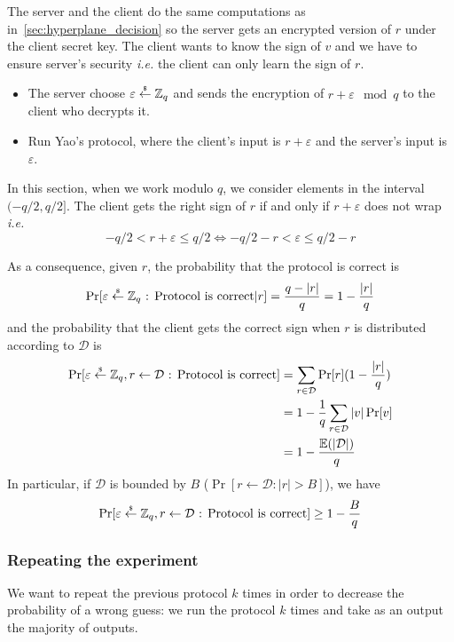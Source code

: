 \documentclass[11pt]{article}
\begin{document}
The server and the client do the same computations as in~\ref{sec:hyperplane_decision} so the server gets an encrypted version of $r$ under the client secret key. The client wants to know the sign of $v$ and we have to ensure server's security \emph{i.e.} the client can only learn the sign of $r$.

\begin{itemize}
	\item The server choose $\varepsilon \stackrel{\scriptscriptstyle{\$}}{\gets} {\mathbb Z}_q$ and sends the encryption of $r + \varepsilon \mod q$ to the client who decrypts it.
	\item Run Yao's protocol, where the client's input is $r + \varepsilon$ and the server's input is $\varepsilon$.
\end{itemize} 

In this section, when we work modulo $q$, we consider elements in the interval $(-q/2, q/2]$. The client gets the right sign of $r$ if and only if $r + \varepsilon$ does not wrap \emph{i.e.}
\[
	-q/2 < r + \varepsilon \leq q/2 \Leftrightarrow  -q/2 - r< \varepsilon \leq q/2 - r
\]

As a consequence, given $r$, the probability that the protocol is correct is 
\[ 
	\Pr[\varepsilon \stackrel{\scriptscriptstyle{\$}}{\gets} {\mathbb Z}_q\text{ : Protocol is correct} | r] = \frac{q - |r|}{q} = 1 - \frac{|r|}{q}
\]
and the probability that the client gets the correct sign when $r$ is distributed according to $\mathcal{D}$ is 
\begin{align*}
	\Pr[\varepsilon \stackrel{\scriptscriptstyle{\$}}{\gets} {\mathbb Z}_q, r \gets \mathcal{D}\text{ : Protocol is correct}] 
		&= \sum_{r \in \mathcal{D}} \Pr[r] (1 - \frac{|r|}{q}) \\
		&= 1 - \frac{1}{q}\sum_{r \in \mathcal{D}} |v| \Pr[v]  \\
		&= 1 - \frac{\mathbb{E}(|\mathcal{D}|)}{q}
\end{align*}
In particular, if $\mathcal{D}$ is bounded by $B$ ($\Pr[ r \gets \mathcal{D} : |r| > B]$), we have
\[
\Pr[\varepsilon \stackrel{\scriptscriptstyle{\$}}{\gets} {\mathbb Z}_q, r \gets \mathcal{D}\text{ : Protocol is correct}] \geq 1 - \frac{B}{q}
\] 
    
\subsubsection{Repeating the experiment}

We want to repeat the previous protocol $k$ times in order to decrease the probability of a wrong guess: we run the protocol $k$ times and take as an output the majority of outputs. 
\end{document}

